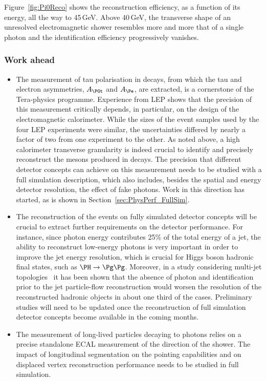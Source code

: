 Figure~\ref{fig:Pi0Reco} shows the \PGpz reconstruction efficiency, as a function of its energy, all the way to 45\,GeV. 
Above 40\,GeV, the transverse shape of an unresolved \PGpz electromagnetic shower resembles more and more that of a single photon 
and the identification efficiency progressively vanishes.

\subsubsection{Work ahead}
\begin{itemize}

\item The measurement of tau polarisation in \PZ decays, from which the tau and electron asymmetries, $A_{\PGt}$ and $A_{\Pe}$, are extracted, 
is a cornerstone of the Tera-\PZ physics programme. 
Experience from LEP shows that the precision of this measurement critically depends, in particular, on the design of the electromagnetic calorimeter. 
While the sizes of the event samples used by the four LEP experiments were similar, 
the uncertainties differed by nearly a factor of two from one experiment to the other. 
As noted above, a high calorimeter transverse granularity is indeed crucial to identify and precisely reconstruct the \PGpz mesons produced in \PGt decays. 
The precision that different detector concepts can achieve on this measurement needs to be studied with a full simulation description, 
which also includes, besides the spatial and energy detector resolution, the effect of fake photons. 
Work in this direction has started, as is shown in Section~\ref{sec:PhysPerf_FullSim}.

\item The reconstruction of the events on fully simulated detector concepts will be crucial to extract further requirements on the detector performance. 
For instance, since photon energy contributes 25\% of the total energy of a jet, 
the ability to reconstruct low-energy photons is very important in order to improve the jet energy resolution, 
which is crucial for Higgs boson hadronic final states, such as $\PH \to \Pg\Pg$. 
Moreover, in a study considering multi-jet topologies~\cite{Lucchini:2020bac} it has been shown 
that the absence of photon and \PGpz identification prior to the jet particle-flow reconstruction 
would worsen the resolution of the reconstructed hadronic objects in about one third of the cases. 
Preliminary studies will need to be updated once the reconstruction of full simulation detector concepts become available in the coming months. 

\item The measurement of long-lived particles decaying to photons relies on a precise standalone ECAL measurement of the direction of the shower. 
The impact of longitudinal segmentation on the pointing capabilities and on displaced vertex reconstruction performance needs to be studied in full simulation.

\end{itemize}

